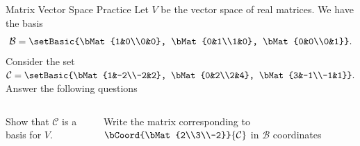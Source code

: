 \documentclass[xcoler=dvipsnames, aspectratio=169]{beamer}
\newcommand{\B}{\mathcal{B}}
\newcommand{\C}{\mathcal{C}}
\begin{document}
    \begin{frame}{Matrix Vector Space Practice}
        Let $V$ be the vector space of  real matrices. We have the
        basis
        \[
            \B=\setBasic{\bMat{1&0\\0&0}, \bMat{0&1\\1&0}, \bMat{0&0\\0&1}}.
        \]
        Consider the set
        $
            \C = \setBasic{\bMat{1&-2\\-2&2}, \bMat{0&2\\2&4}, \bMat{3&-1\\-1&1}}.
        $
        Answer the following questions
        \begin{columns}
             Show that $\C$ is a basis for $V$.

            \iftoggle{showSolutions}{
                \only<2->{
                    Set up and show
                    \[
                        \underset{\B\leftarrow\C}{P} = \bMat{
                            1 & 0 & 3\\
                            -2 & 2 & -1\\
                            2 & 4 & 1
                        }
                    \]
                    is invertible.
                }
            }{\vspace{130pt}}
             Write the matrix corresponding to
            $
                \bCoord{\bMat{2\\3\\-2}}{\C}
            $ in $\B$ coordinates

            \iftoggle{showSolutions}{
                \only<3->{
                    \[
                        \bMat{
                            -4 & 4\\
                            4 & 14
                        }
                    \]
                }
            }{\vspace{100pt}}
        \end{columns}
    \end{frame}
\end{document}
